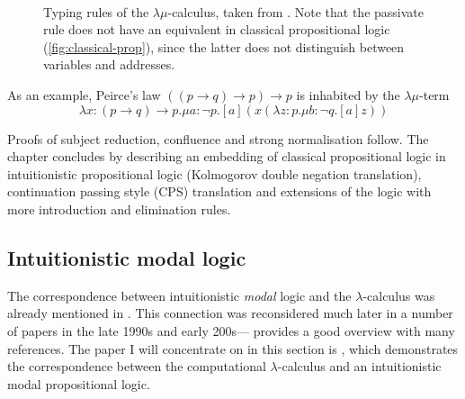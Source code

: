 \documentclass[12pt,toc=bibliography,numbers=noendperiod,
               footnotes=multiple,twoside]{scrartcl}
\begin{document}
\begin{figure}
\begin{minipage}[b]{.5\linewidth}
\begin{prooftree}
        \end{prooftree}
    \end{minipage}
    \\
    \vspace{10pt}
    \begin{minipage}[b]{.5\linewidth}
        \begin{prooftree}
        \end{prooftree}
    \end{minipage}
    \caption{Typing rules of the \(\lambda\mu\)-calculus, taken from \textcite[133]{sorensen_lectures_2006}. Note that the passivate rule does not have an equivalent in classical propositional logic (\cref{fig:classical-prop}), since the latter does not distinguish between variables and addresses.}
    \label{fig:lambda-mu-typing}
\end{figure}

As an example, Peirce's law \(((p \rightarrow q) \rightarrow p) \rightarrow p\) is inhabited by the \(\lambda\mu\)-term \[\lambda x:(p \rightarrow q) \rightarrow p.\mu a:\neg p.[a](x(\lambda z:p.\mu b:\neg q.[a]z))\]

Proofs of subject reduction, confluence and strong normalisation follow. The chapter concludes by describing an embedding of classical propositional logic in intuitionistic propositional logic (Kolmogorov double negation translation), continuation passing style (CPS) translation and extensions of the logic with more introduction and elimination rules.


\subsection{Intuitionistic modal logic}

The correspondence between intuitionistic \emph{modal} logic and the \(\lambda\)-calculus was already mentioned in \textcite{curry_elimination_1952}. This connection was reconsidered much later in a number of papers in the late 1990s and early 200s---\textcite{paiva_modalities_2004} provides a good overview with many references. The paper I will concentrate on in this section is \textcite{benton_computational_1995}, which demonstrates the correspondence between the computational \(\lambda\)-calculus \autocite{moggi_notions_1991} and an intuitionistic modal propositional logic.
\end{document}
